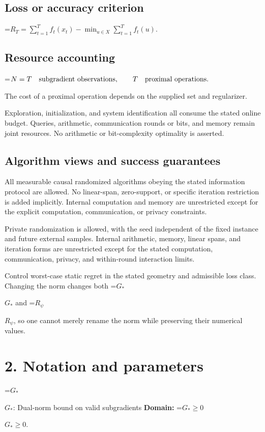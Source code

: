 \documentclass[10pt,a4paper]{article}
\newcommand{\AtlasMath}[1]{\par\begingroup\centering\setbox0=\hbox{$\displaystyle #1$}\ifdim\wd0>1.4\linewidth\typeout{ATLAS WIDE FORMULA: \the\wd0}\fi\ifdim\wd0>\linewidth\resizebox{\linewidth}{!}{\box0}\else\box0\fi\par\endgroup}
\newcommand{\AtlasInlineMath}[1]{\begingroup\setbox0=\hbox{$#1$}\ifdim\wd0>.4\linewidth\endgroup\AtlasMath{#1}\else\endgroup$#1$\fi}
\begin{document}
\subsection{Loss or accuracy criterion}

\AtlasMath{R_T=\sum_{t=1}^{T}f_t(x_t)-\min_{u\in X}\sum_{t=1}^{T}f_t(u).}


\subsection{Resource accounting}

\AtlasMath{N=T\quad\text{\text{subgradient observations}},\qquad T\quad\text{\text{proximal operations}}.}


The cost of a proximal operation depends on the supplied set and regularizer.

Exploration, initialization, and system identification all consume the stated online budget. Queries, arithmetic, communication rounds or bits, and memory remain joint resources. No arithmetic or bit-complexity optimality is asserted.

\subsection{Algorithm views and success guarantees}
All measurable causal randomized algorithms obeying the stated information protocol are allowed. No linear-span, zero-support, or specific iteration restriction is added implicitly. Internal computation and memory are unrestricted except for the explicit computation, communication, or privacy constraints.

Private randomization is allowed, with the seed independent of the fixed instance and future external samples. Internal arithmetic, memory, linear spans, and iteration forms are unrestricted except for the stated computation, communication, privacy, and within-round interaction limits.

Control worst-case static regret in the stated geometry and admissible loss class. Changing the norm changes both \AtlasInlineMath{G_*} and \AtlasInlineMath{R_\psi}, so one cannot merely rename the norm while preserving their numerical values.

\section{2. Notation and parameters}
\AtlasInlineMath{G_*}: Dual-norm bound on valid subgradients \textbf{Domain:} \AtlasInlineMath{G_*\ge0}.
\end{document}
